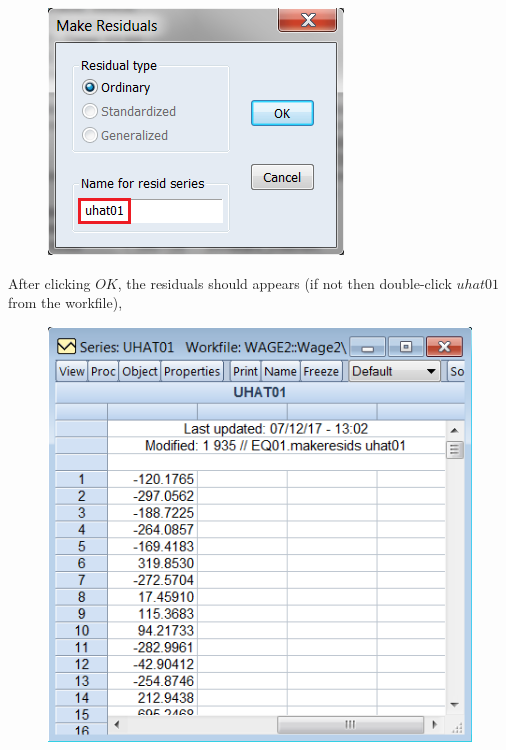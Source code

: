 \documentclass[12pt]{report}
\begin{document}
\vspace{-\baselineskip}
\begin{figure}[H]
	\centering
	\includegraphics{q3_17}
\end{figure}
\vspace{-\baselineskip}
\noindent After clicking $OK$, the residuals should appears (if not then double-click $uhat01$ from the workfile),
\begin{figure}[H]
	\centering
	\includegraphics{q3_18}
\end{figure}
\vspace{-\baselineskip}
\newpage
\justify
\end{document}
